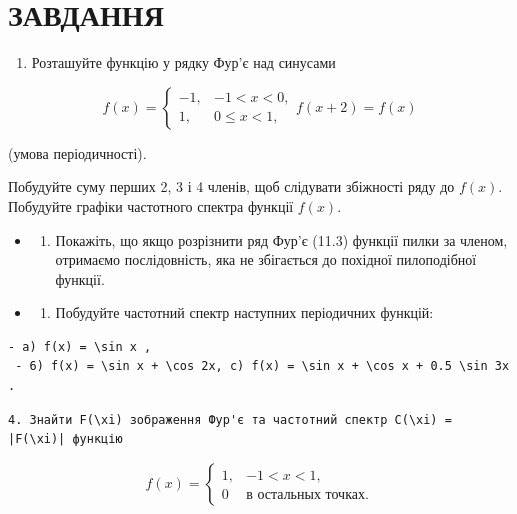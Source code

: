 \documentclass[
  ukrainian,
]{article}
\providecommand{\tightlist}{%
  \setlength{\itemsep}{0pt}\setlength{\parskip}{0pt}}
\begin{document}
\section{ЗАВДАННЯ}\label{ux437ux430ux432ux434ux430ux43dux43dux44f-3}

\begin{enumerate}
\def\labelenumi{\arabic{enumi}.}
\tightlist
\item
  Розташуйте функцію у рядку Фур'є над синусами
\end{enumerate}

\[
f(x) =
\begin{cases} -1, & -1 < x < 0, \\ 1, & 0 \le x < 1, \end{cases}
f(x+2) = f(x)
\]

(умова періодичності).

Побудуйте суму перших 2, 3 і 4 членів, щоб слідувати збіжності ряду до
\(f(x)\). Побудуйте графіки частотного спектра функції \(f(x)\).

\begin{itemize}
\tightlist
\item
  \begin{enumerate}
  \def\labelenumi{\arabic{enumi}.}
  \setcounter{enumi}{1}
  \tightlist
  \item
    Покажіть, що якщо розрізнити ряд Фур'є (11.3) функції пилки за
    членом, отримаємо послідовність, яка не збігається до похідної
    пилоподібної функції.
  \end{enumerate}
\item
  \begin{enumerate}
  \def\labelenumi{\arabic{enumi}.}
  \setcounter{enumi}{2}
  \tightlist
  \item
    Побудуйте частотний спектр наступних періодичних функцій:
  \end{enumerate}
\end{itemize}

\begin{verbatim}
- a) f(x) = \sin x ,
 - 6) f(x) = \sin x + \cos 2x, c) f(x) = \sin x + \cos x + 0.5 \sin 3x .
\end{verbatim}

\begin{verbatim}
4. Знайти F(\xi) зображення Фур'є та частотний спектр C(\xi) = |F(\xi)| функцію
\end{verbatim}

\[
f(x) =
\begin{cases} 1, & -1 < x < 1, \\ 0 & \text{в остальных точках.} \end{cases}
\]
\end{document}

